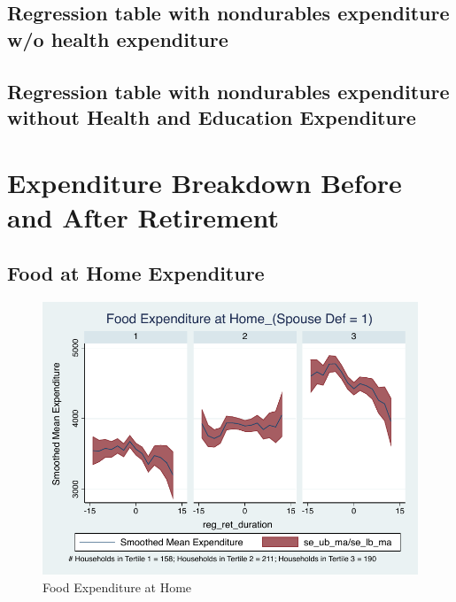 \documentclass[a4paper]{article}
\begin{document}
\begin{landscape}
\clearpage

\subsection{Regression table with nondurables expenditure w/o health expenditure} 

\clearpage

\subsection{Regression table with nondurables expenditure without Health and Education Expenditure}

\clearpage

\end{landscape}
	
\section{Expenditure Breakdown Before and After Retirement}
\subsection{Food at Home Expenditure}

\begin{table}[h]
	\centering
	
\end{table}

\begin{figure}[h]
	\caption{Food Expenditure at Home}
	\centering
	\includegraphics[width=1.0\textwidth]{../ConsumptionPostRetirement_by_SpouseDef_Cats/Smoothed/1/spouse_def_total_foodexp_home_real.pdf}
\end{figure}
\end{document}
